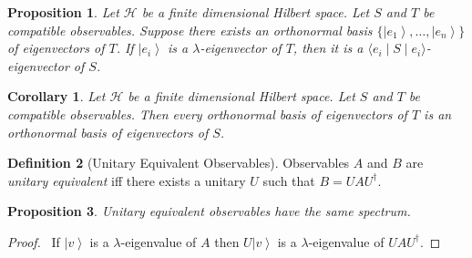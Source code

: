 \documentclass{book}
\let\qed\relax
\newtheorem{prop}{Proposition}[chapter]
\newtheorem{cor}{Corollary}[prop]
\theoremstyle{definition}
\newtheorem{df}[prop]{Definition}
\newcommand{\ket}[1]{\ensuremath{\left| {#1} \right\rangle}}
\begin{document}
\begin{prop}
Let $\mathcal{H}$ be a finite dimensional Hilbert space. Let $S$ and $T$ be compatible observables.
Suppose there exists an orthonormal basis $\{ \ket{e_1}, \ldots, \ket{e_n} \}$ of eigenvectors of $T$. If $\ket{e_i}$ is a $\lambda$-eigenvector of $T$, then it is a $\langle e_i \mid S \mid e_i \rangle$-eigenvector of $S$.
\end{prop}


\begin{cor}
Let $\mathcal{H}$ be a finite dimensional Hilbert space. Let $S$ and $T$ be compatible observables. Then every orthonormal basis of eigenvectors of $T$ is an orthonormal basis of eigenvectors of $S$.
\end{cor}

\begin{df}[Unitary Equivalent Observables]
Observables $A$ and $B$ are \emph{unitary equivalent} iff there exists a unitary $U$ such that $B = UAU^\dagger$.
\end{df}

\begin{prop}
Unitary equivalent observables have the same spectrum.
\end{prop}

\begin{proof}
\pf\ If $\ket{v}$ is a $\lambda$-eigenvalue of $A$ then $U\ket{v}$ is a $\lambda$-eigenvalue of $UAU^\dagger$. \qed
\end{proof}
\end{document}
